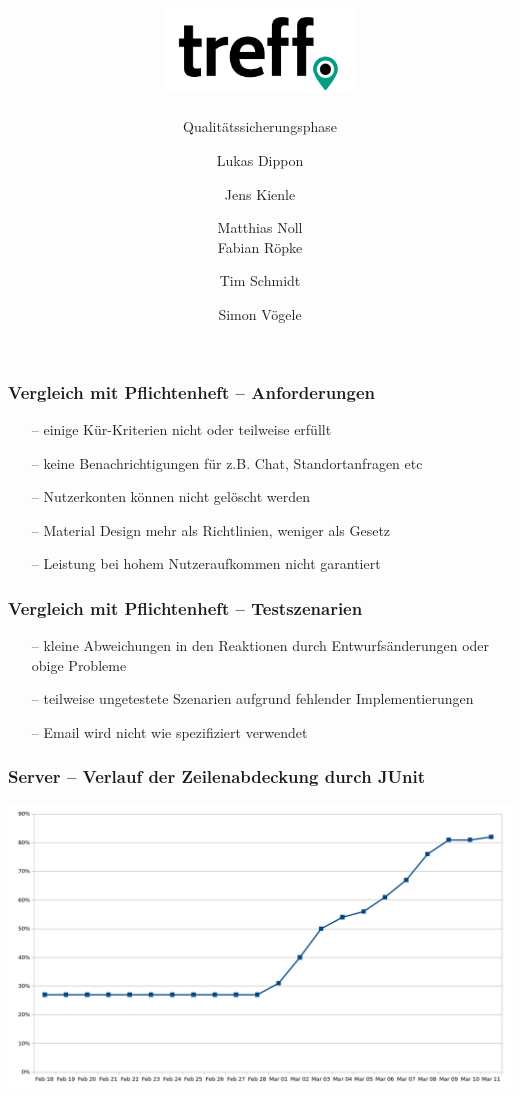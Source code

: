 \documentclass[aspectratio=1610]{beamer}
\title{\includegraphics[width = 50mm]{images/logo_crop.png}}
\subtitle{\huge Qualitätssicherungsphase}
\author{Lukas Dippon
	\and Jens Kienle
	\and Matthias Noll
    \\Fabian Röpke
	\and Tim Schmidt
	\and Simon Vögele}
\begin{document}
	\begin{frame}[plain]
	\maketitle
	\end{frame}


	\begin{frame}[plain]
        \frametitle{\textbf{Vergleich mit Pflichtenheft} -- Anforderungen}

        \begin{itemize}
          \item[--] einige Kür-Kriterien nicht oder teilweise erfüllt
          \item[--] keine Benachrichtigungen für
                    z.B. Chat, Standortanfragen etc
          \item[--] Nutzerkonten können nicht gelöscht werden
          \item[--] Material Design mehr als Richtlinien, weniger als Gesetz
          \item[--] Leistung bei hohem Nutzeraufkommen nicht garantiert
        \end{itemize}

  \end{frame}

  \begin{frame}[plain]
        \frametitle{\textbf{Vergleich mit Pflichtenheft} -- Testszenarien}

        \begin{itemize}
          \item[--] kleine Abweichungen in den Reaktionen
                    durch Entwurfsänderungen oder obige Probleme
          \item[--] teilweise ungetestete Szenarien aufgrund
                    fehlender Implementierungen
          \item[--] Email wird nicht wie spezifiziert verwendet
        \end{itemize}

  \end{frame}


	\begin{frame}[plain]
        \frametitle{\textbf{Server} -- Verlauf der Zeilenabdeckung durch JUnit}
        \includegraphics[width = \columnwidth]{images/test-coverage-graph.png}
  \end{frame}
\end{document}

